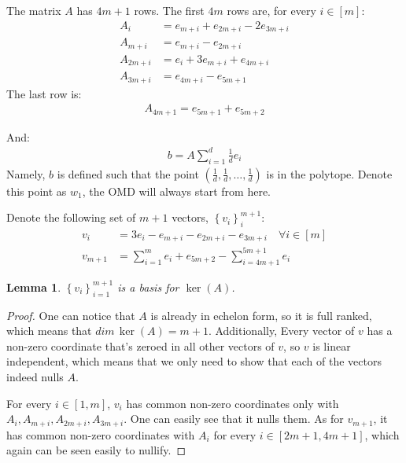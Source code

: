 \documentclass[10pt]{article}
\newtheorem{lemma}[theorem]{Lemma}
\theoremstyle{definition}
\theoremstyle{remark}
\newcommand{\curly}[1]{ {\left\{ #1 \right\}}}
\newcommand{\roundy}[1]{ {\left( #1 \right)}}
\begin{document}
The matrix $A$ has $4m+1$ rows. The first $4m$ rows are, for every $i\in[m]$:
\begin{align*}
    A_i &= e_{m+i} + e_{2m+i} - 2e_{3m+i} \\
    A_{m+i} &= e_{m+i} - e_{2m+i} \\
    A_{2m+i} &= e_i + 3e_{m+i} + e_{4m+i}\\
    A_{3m+i} &= e_{4m+i} - e_{5m+1}
\end{align*}
The last row is:
\begin{align*}
    A_{4m+1} = e_{5m+1} + e_{5m+2}
\end{align*}

And:
\begin{align*}
    b = A\sum_{i=1}^d\frac{1}{d}e_i
\end{align*}
Namely, $b$ is defined such that the point $\roundy{\frac{1}{d},\frac{1}{d},\dots,\frac{1}{d}}$ is in the polytope. Denote this point as $w_1$, the OMD will always start from here.

Denote the following set of $m+1$ vectors, $\curly{v_i}_i^{m+1}$:
\begin{align*}
    v_i &= 3e_i - e_{m+i} - e_{2m+i} - e_{3m+i} \quad\forall i\in[m]\\
    v_{m+1} &= \sum_{i=1}^m e_i + e_{5m+2} - \sum_{i=4m+1}^{5m+1}e_i
\end{align*}

\begin{lemma}\label{lem:A ker}
$\curly{v_i}_{i=1}^{m+1}$ is a basis for $\ker(A)$.
\end{lemma}
\begin{proof}
One can notice that $A$ is already in echelon form, so it is full ranked, which means that $dim \,\ker(A) = m+1$. Additionally, Every vector of $v$ has a non-zero coordinate that's zeroed in all other vectors of $v$, so $v$ is linear independent, which means that we only need to show that each of the vectors indeed nulls $A$.

For every $i\in[1,m]$, $v_i$ has common non-zero coordinates only with $A_i,A_{m+i},A_{2m+i},A_{3m+i}$. One can easily see that it nulls them. As for $v_{m+1}$, it has common non-zero coordinates with $A_i$ for every $i\in[2m+1,4m+1]$, which again can be seen easily to nullify.
\end{proof}
\end{document}
